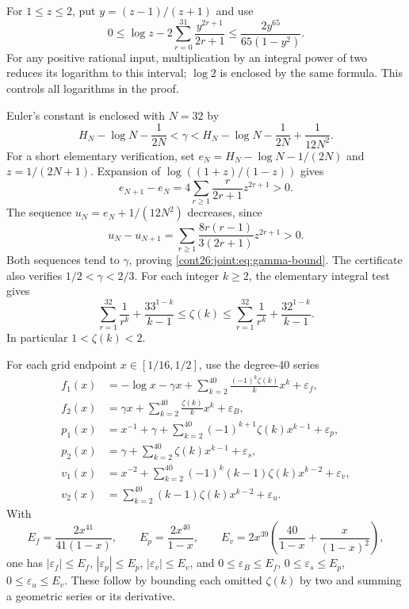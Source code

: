 \documentclass[11pt,letterpaper]{article}
\numberwithin{equation}{section}
\theoremstyle{plain}
\theoremstyle{definition}
\theoremstyle{remark}
\begin{document}
For $1\le z\le2$, put $y=(z-1)/(z+1)$ and use
\begin{equation}\label{cont26:joint:eq:log-bound}
 0\le\log z-2\sum_{r=0}^{31}\frac{y^{2r+1}}{2r+1}
 \le\frac{2y^{65}}{65(1-y^2)}.
\end{equation}
For any positive rational input, multiplication by an integral power
of two reduces its logarithm to this interval; $\log2$ is enclosed
by the same formula.  This controls all logarithms in the proof.

Euler's constant is enclosed with $N=32$ by
\begin{equation}\label{cont26:joint:eq:gamma-bound}
 H_N-\log N-\frac1{2N}<\gamma<
 H_N-\log N-\frac1{2N}+\frac1{12N^2}.
\end{equation}
For a short elementary verification, set
$e_N=H_N-\log N-1/(2N)$ and $z=1/(2N+1)$.
Expansion of $\log((1+z)/(1-z))$ gives
\[
 e_{N+1}-e_N=
 4\sum_{r\ge1}\frac{r}{2r+1}z^{2r+1}>0.
\]
The sequence $u_N=e_N+1/(12N^2)$ decreases, since
\[
 u_N-u_{N+1}=
 \sum_{r\ge1}\frac{8r(r-1)}{3(2r+1)}z^{2r+1}>0.
\]
Both sequences tend to $\gamma$, proving \eqref{cont26:joint:eq:gamma-bound}.
The certificate also verifies $1/2<\gamma<2/3$.
For each integer $k\ge2$, the elementary integral test gives
\begin{equation}\label{cont26:joint:eq:zeta-bound}
 \sum_{r=1}^{32}\frac1{r^k}+\frac{33^{1-k}}{k-1}
 \le\zeta(k)\le
 \sum_{r=1}^{32}\frac1{r^k}+\frac{32^{1-k}}{k-1}.
\end{equation}
In particular $1<\zeta(k)<2$.

For each grid endpoint $x\in[1/16,1/2]$, use the degree-40 series
\begin{align*}
 f_1(x)&=-\log x-\gamma x+
       \sum_{k=2}^{40}\frac{(-1)^k\zeta(k)}k x^k+\varepsilon_f,\\
 f_2(x)&=\gamma x+
       \sum_{k=2}^{40}\frac{\zeta(k)}k x^k+\varepsilon_B,\\
 p_1(x)&=x^{-1}+\gamma+
       \sum_{k=2}^{40}(-1)^{k+1}\zeta(k)x^{k-1}+\varepsilon_p,\\
 p_2(x)&=\gamma+
       \sum_{k=2}^{40}\zeta(k)x^{k-1}+\varepsilon_s,\\
 v_1(x)&=x^{-2}+
       \sum_{k=2}^{40}(-1)^k(k-1)\zeta(k)x^{k-2}+\varepsilon_v,\\
 v_2(x)&=\sum_{k=2}^{40}(k-1)\zeta(k)x^{k-2}+\varepsilon_u.
\end{align*}
With
\[
 E_f=\frac{2x^{41}}{41(1-x)},\qquad
 E_p=\frac{2x^{40}}{1-x},\qquad
 E_v=2x^{39}\left(\frac{40}{1-x}+\frac{x}{(1-x)^2}\right),
\]
one has $|\varepsilon_f|\le E_f$,
$|\varepsilon_p|\le E_p$, $|\varepsilon_v|\le E_v$,
and $0\le\varepsilon_B\le E_f$,
$0\le\varepsilon_s\le E_p$, $0\le\varepsilon_u\le E_v$.
These follow by bounding each omitted $\zeta(k)$ by two and summing
a geometric series or its derivative.
\end{document}
